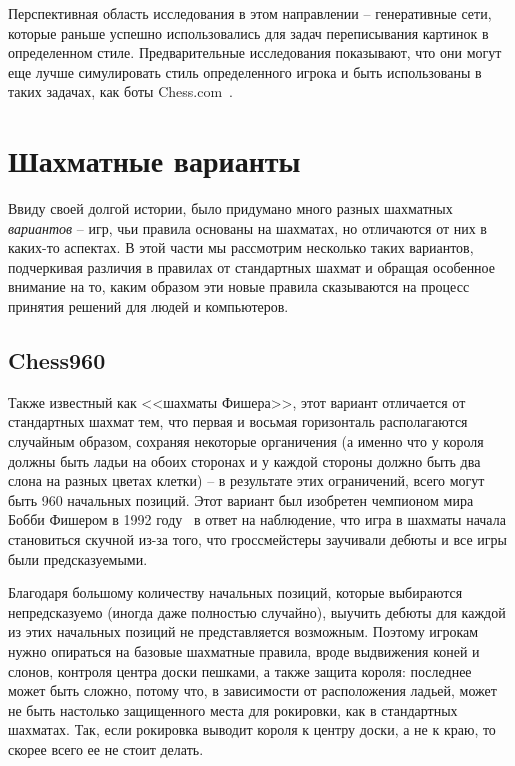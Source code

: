 \documentclass{article}
\begin{document}
Перспективная область исследования в этом направлении -- генеративные сети,
которые раньше успешно использовались для задач переписывания картинок в определенном стиле.
Предварительные исследования показывают, что они могут еще лучше симулировать стиль определенного игрока
и быть использованы в таких задачах, как боты Chess.com~\cite{chess-stylegan}.

\section{Шахматные варианты}

Ввиду своей долгой истории, было придумано много разных шахматных \emph{вариантов} --
игр, чьи правила основаны на шахматах, но отличаются от них в каких-то аспектах.
В этой части мы рассмотрим несколько таких вариантов, 
подчеркивая различия в правилах от стандартных шахмат
и обращая особенное внимание на то,
каким образом эти новые правила
сказываются на процесс принятия решений для людей и компьютеров.

\subsection{Chess960}

Также известный как <<шахматы Фишера>>, этот вариант
отличается от стандартных шахмат тем, что первая и восьмая горизонталь располагаются случайным образом,
сохраняя некоторые органичения (а именно что у короля должны быть ладьи на обоих сторонах и у каждой стороны должно быть два слона на разных цветах клетки) --
в результате этих ограничений, всего могут быть 960 начальных позиций.
Этот вариант был изобретен чемпионом мира Бобби Фишером в 1992 году~\cite{chess960}
в ответ на наблюдение, что игра в шахматы начала становиться скучной
из-за того, что гроссмейстеры заучивали дебюты 
и все игры были предсказуемыми.

Благодаря большому количеству начальных позиций, 
которые выбираются непредсказуемо (иногда даже полностью случайно),
выучить дебюты для каждой из этих начальных позиций
не представляется возможным.
Поэтому игрокам нужно опираться на базовые шахматные правила,
вроде выдвижения коней и слонов, контроля центра доски пешками,
а также защита короля:
последнее может быть сложно, потому что, в зависимости от расположения ладьей,
может не быть настолько защищенного места для рокировки, как в стандартных шахматах.
Так, если рокировка выводит короля к центру доски, а не к краю, то скорее всего ее не стоит делать.
\end{document}
